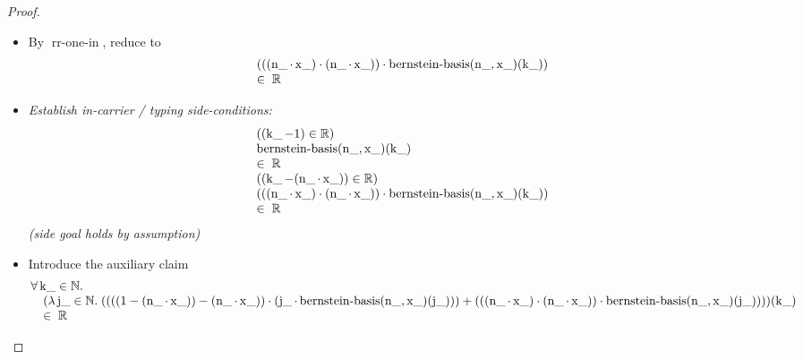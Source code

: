 \documentclass[11pt]{article}
\theoremstyle{plain}
\begin{document}
\begin{proof}
\begin{itemize}[leftmargin=2.8em, itemsep=4pt, parsep=1pt]
  \item[\textbf{58}] By $\operatorname{rr\text{-}one\text{-}in}$, reduce to
\begin{equation*}
\begin{array}{@{}l@{}} (((\operatorname{n\_} \cdot \operatorname{x\_}) \cdot (\operatorname{n\_} \cdot \operatorname{x\_})) \cdot \operatorname{bernstein\text{-}basis}(\operatorname{n\_}, \operatorname{x\_})(\operatorname{k\_})) \\ \in\; \mathbb{R} \end{array}
\end{equation*}

  \item[\textbf{59--63}] \emph{Establish in-carrier / typing side-conditions:}
\begin{equation*}
\begin{array}{@{}l@{}}
((\operatorname{k\_} - 1) \in \mathbb{R}) \\
\begin{array}{@{}l@{}} \operatorname{bernstein\text{-}basis}(\operatorname{n\_}, \operatorname{x\_})(\operatorname{k\_}) \\ \in\; \mathbb{R} \end{array} \\
((\operatorname{k\_} - (\operatorname{n\_} \cdot \operatorname{x\_})) \in \mathbb{R}) \\
\begin{array}{@{}l@{}} (((\operatorname{n\_} \cdot \operatorname{x\_}) \cdot (\operatorname{n\_} \cdot \operatorname{x\_})) \cdot \operatorname{bernstein\text{-}basis}(\operatorname{n\_}, \operatorname{x\_})(\operatorname{k\_})) \\ \in\; \mathbb{R} \end{array}
\end{array}
\end{equation*}
  \emph{(side goal holds by assumption)}
  \item[\textbf{64}] Introduce the auxiliary claim
\begin{equation*}
\begin{array}{@{}l@{}} \forall \operatorname{k\_} \in \mathbb{N}. \\ \quad (\lambda \operatorname{j\_} \in \mathbb{N}.\; ((((1 - (\operatorname{n\_} \cdot \operatorname{x\_})) - (\operatorname{n\_} \cdot \operatorname{x\_})) \cdot (\operatorname{j\_} \cdot \operatorname{bernstein\text{-}basis}(\operatorname{n\_}, \operatorname{x\_})(\operatorname{j\_}))) + (((\operatorname{n\_} \cdot \operatorname{x\_}) \cdot (\operatorname{n\_} \cdot \operatorname{x\_})) \cdot \operatorname{bernstein\text{-}basis}(\operatorname{n\_}, \operatorname{x\_})(\operatorname{j\_}))))(\operatorname{k\_}) \\ \quad \in\; \mathbb{R} \end{array}
\end{equation*}


\end{itemize}
\end{proof}
\end{document}
